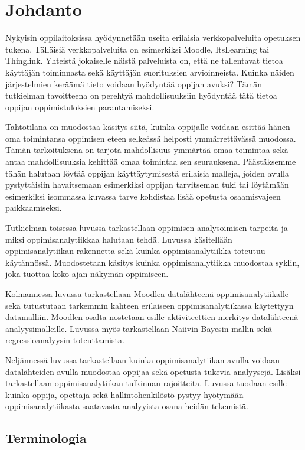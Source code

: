 \chapter{Johdanto\label{johdanto}}

Nykyisin oppilaitoksissa hyödynnetään useita erilaisia verkkopalveluita opetuksen tukena. Tälläisiä verkkopalveluita on esimerkiksi Moodle, ItsLearning tai Thinglink. Yhteistä jokaiselle näistä palveluista on, että ne tallentavat tietoa käyttäjän toiminnasta sekä käyttäjän suorituksien arvioinneista. Kuinka näiden järjestelmien keräämä tieto voidaan hyödyntää oppijan avuksi? Tämän tutkielman tavoitteena on perehtyä mahdollisuuksiin hyödyntää tätä tietoa oppijan oppimistuloksien parantamiseksi.

Tahtotilana on muodostaa käsitys siitä, kuinka oppijalle voidaan esittää hänen oma toimintansa oppimisen eteen selkeässä helposti ymmärrettävässä muodossa. Tämän tarkoituksena on tarjota mahdollisuus ymmärtää omaa toimintaa sekä antaa mahdollisuuksia kehittää omaa toimintaa sen seurauksena. Päästäksemme tähän halutaan löytää oppijan käyttäytymisestä erilaisia malleja, joiden avulla pystyttäisiin havaitsemaan esimerkiksi oppijan tarvitseman tuki tai löytämään esimerkiksi isommassa kuvassa tarve kohdistaa lisää opetusta osaamisvajeen paikkaamiseksi.

Tutkielman toisessa luvussa tarkastellaan oppimisen analysoimisen tarpeita ja miksi oppimisanalytiikkaa halutaan tehdä. Luvussa käsitellään oppimisanalytiikan rakennetta sekä kuinka oppimisanalytiikka toteutuu käytännössä. Muodostetaan käsitys kuinka oppimisanalytiikka muodostaa syklin, joka tuottaa koko ajan näkymän oppimiseen.

Kolmannessa luvussa tarkastellaan Moodlea datalähteenä oppimisanalytiikalle sekä tutustutaan tarkemmin kahteen erilaiseen oppimisanalytiikassa käytettyyn datamalliin. Moodlen osalta nostetaan esille aktiviteettien merkitys datalähteenä analyysimalleille. Luvussa myös tarkastellaan Naiivin Bayesin mallin sekä regressioanalyysin toteuttamista.

Neljännessä luvussa tarkastellaan kuinka oppimisanalytiikan avulla voidaan datalähteiden avulla muodostaa oppijaa sekä opetusta tukevia analyysejä. Lisäksi tarkastellaan oppimisanalytiikan tulkinnan rajoitteita. Luvussa tuodaan esille kuinka oppija, opettaja sekä hallintohenkilöstö pystyy hyötymään oppimisanalytiikasta saatavasta analyyista osana heidän tekemistä.

\section{Terminologia}

